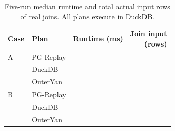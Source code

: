 \begin{table}[t]
  \centering
  \small
  \caption{Five-run median runtime and total actual input rows of real
  joins. All plans execute in DuckDB.}
  \label{tab:pgplan-runtime}
  \begin{tabular}{llrr}
    \toprule
    Case & Plan & Runtime (ms) & \shortstack{Join input\\(rows)} \\
    \midrule
    A & PG-Replay & \fix{--} & \fix{--} \\
      & DuckDB    & \fix{--} & \fix{--} \\
      & OuterYan  & \fix{--} & \fix{--} \\
    \midrule
    B & PG-Replay & \fix{--} & \fix{--} \\
      & DuckDB    & \fix{--} & \fix{--} \\
      & OuterYan  & \fix{--} & \fix{--} \\
    \bottomrule
  \end{tabular}
\end{table}
